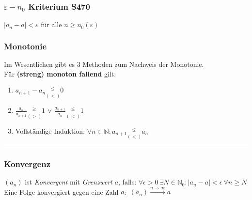 \documentclass[6pt,a4paper]{scrartcl}
\newcommand{\abs}[1]{\ensuremath{\left\vert#1\right\vert}}
\begin{document}
\begin{multicols*}{2}
\begin{multicols}{2}
\subsubsection{$\varepsilon -n_{0}$ Kriterium \color{red}S470}
$|a_{n}-a|<\varepsilon$ für alle $n\geq n_{0}(\varepsilon)$\\
\subsubsection{Monotonie}
Im Wesentlichen gibt es 3 Methoden zum Nachweis der Monotonie.\\
Für \textbf{(streng) monoton fallend} gilt:
\begin{enumerate}\itemsep0pt
\item $a_{n+1} - a_n \underset{(<)}{^{\le}} 0$
\item $\frac{a_n}{a_{n+1}} \underset{(>)}{^{\ge}} 1$ \qquad $\lor$ \qquad $\frac{a_{n+1}}{a_n} \underset{(<)}{^{\le}} 1$
\item Vollständige Induktion: $\forall n \in \mathbb{N}: a_{n+1}\underset{(<)}{^{\le}} a_n$
\end{enumerate}
\end{multicols}
\hrule
\subsubsection{Konvergenz}
$(a_n)$ ist \emph{Konvergent} mit \emph{Grenzwert} $a$, falls: $\forall \epsilon > 0 \ \exists N  \in \mathbb N_0:  \abs{a_n -a} < \epsilon \ \forall n \ge N$\\
Eine Folge konvergiert gegen eine Zahl $a$:\ $(a_n) \overset{n \rightarrow \infty}{\longrightarrow} a$

\end{multicols*}
\end{document}
